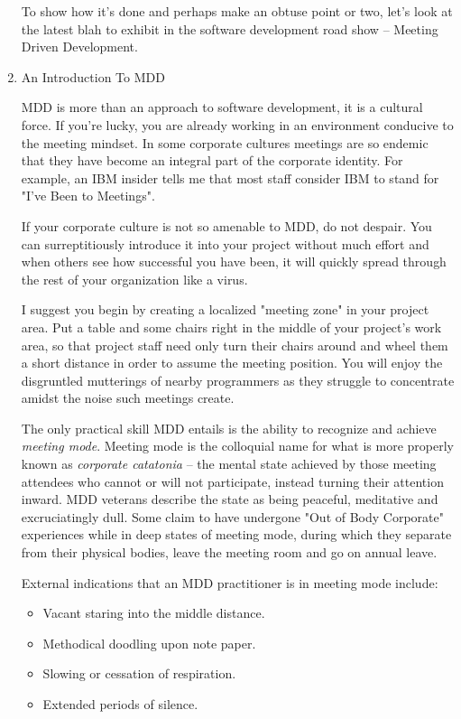 \documentclass{article}
\begin{document}
\begin{enumerate}
To show how it's done and perhaps make an obtuse point or two, let's
look at the latest blah to exhibit in the software development road show
-- Meeting Driven Development.

\item An Introduction To MDD
\label{sec:orgheadline180}

MDD is more than an approach to software development, it is a cultural
force. If you're lucky, you are already working in an environment
conducive to the meeting mindset. In some corporate cultures meetings
are so endemic that they have become an integral part of the corporate
identity. For example, an IBM insider tells me that most staff consider
IBM to stand for "I've Been to Meetings".

If your corporate culture is not so amenable to MDD, do not despair. You
can surreptitiously introduce it into your project without much effort
and when others see how successful you have been, it will quickly spread
through the rest of your organization like a virus.

I suggest you begin by creating a localized "meeting zone" in your
project area. Put a table and some chairs right in the middle of your
project's work area, so that project staff need only turn their chairs
around and wheel them a short distance in order to assume the meeting
position. You will enjoy the disgruntled mutterings of nearby
programmers as they struggle to concentrate amidst the noise such
meetings create.

The only practical skill MDD entails is the ability to recognize and
achieve \emph{meeting mode}. Meeting mode is the colloquial name for what is
more properly known as \emph{corporate catatonia} -- the mental state
achieved by those meeting attendees who cannot or will not participate,
instead turning their attention inward. MDD veterans describe the state
as being peaceful, meditative and excruciatingly dull. Some claim to
have undergone "Out of Body Corporate" experiences while in deep states
of meeting mode, during which they separate from their physical bodies,
leave the meeting room and go on annual leave.

External indications that an MDD practitioner is in meeting mode
include:

\begin{itemize}
\item Vacant staring into the middle distance.
\item Methodical doodling upon note paper.
\item Slowing or cessation of respiration.
\item Extended periods of silence.
\end{itemize}


\end{enumerate}
\end{document}
